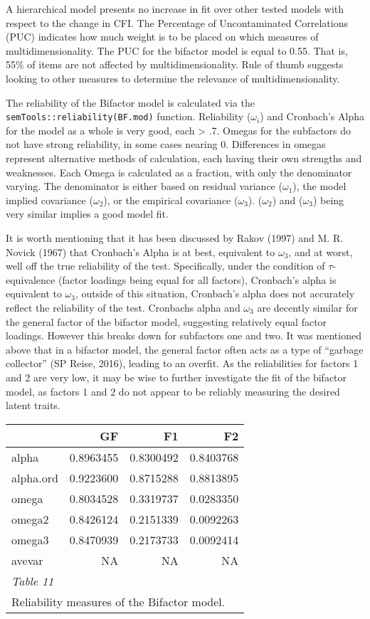 \documentclass[
  man,floatsintext]{apa6}
\begin{document}
A hierarchical model presents no increase in fit over other tested models with respect to the change in CFI. The Percentage of Uncontaminated Correlations (PUC) indicates how much weight is to be placed on which measures of multidimensionality. The PUC for the bifactor model is equal to 0.55. That is, 55\% of items are not affected by multidimensionality. Rule of thumb suggests looking to other measures to determine the relevance of multidimensionality.

The reliability of the Bifactor model is calculated via the \texttt{semTools::reliability(BF.mod)} function. Reliability (\(\omega_i\)) and Cronbach's Alpha for the model as a whole is very good, each \textgreater{} .7. Omegas for the subfactors do not have strong reliability, in some cases nearing 0. Differences in omegas represent alternative methods of calculation, each having their own strengths and weaknesses. Each Omega is calculated as a fraction, with only the denominator varying. The denominator is either based on residual variance (\(\omega_1\)), the model implied covariance (\(\omega_2\)), or the empirical covariance (\(\omega_3\)). (\(\omega_2\)) and (\(\omega_3\)) being very similar implies a good model fit.

It is worth mentioning that it has been discussed by Rakov (1997) and M. R. Novick (1967) that Cronbach's Alpha is at best, equivalent to \(\omega_3\), and at worst, well off the true reliability of the test. Specifically, under the condition of \(\tau\)-equivalence (factor loadings being equal for all factors), Cronbach's alpha is equivalent to \(\omega_3\), outside of this situation, Cronbach's alpha does not accurately reflect the reliability of the test. Cronbachs alpha and \(\omega_3\) are decently similar for the general factor of the bifactor model, suggesting relatively equal factor loadings. However this breaks down for subfactors one and two. It was mentioned above that in a bifactor model, the general factor often acts as a type of ``garbage collector'' (SP Reise, 2016), leading to an overfit. As the reliabilities for factors 1 and 2 are very low, it may be wise to further investigate the fit of the bifactor model, as factors 1 and 2 do not appear to be reliably measuring the desired latent traits.

\begin{longtable}{lrrr}
\toprule
  & GF & F1 & F2\\
\midrule
alpha & 0.8963455 & 0.8300492 & 0.8403768\\
alpha.ord & 0.9223600 & 0.8715288 & 0.8813895\\
omega & 0.8034528 & 0.3319737 & 0.0283350\\
omega2 & 0.8426124 & 0.2151339 & 0.0092263\\
omega3 & 0.8470939 & 0.2173733 & 0.0092414\\
\addlinespace
avevar & NA & NA & NA\\
\bottomrule
\multicolumn{4}{l}{\rule{0pt}{1em}\textit{Table 11}}\\
\multicolumn{4}{l}{\rule{0pt}{1em}Reliability measures of the Bifactor model.}\\
\end{longtable}
\end{document}
